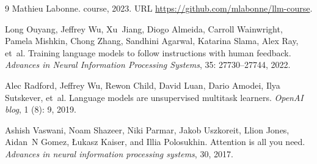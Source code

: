 \begin{thebibliography}{9}
Mathieu Labonne.
 course, 2023.
\newblock URL \url{https://github.com/mlabonne/llm-course}.

Long Ouyang, Jeffrey Wu, Xu~Jiang, Diogo Almeida, Carroll Wainwright, Pamela Mishkin, Chong Zhang, Sandhini Agarwal, Katarina Slama, Alex Ray, et~al.
\newblock Training language models to follow instructions with human feedback.
\newblock \emph{Advances in Neural Information Processing Systems}, 35: 27730--27744, 2022.

Alec Radford, Jeffrey Wu, Rewon Child, David Luan, Dario Amodei, Ilya Sutskever, et~al.
\newblock Language models are unsupervised multitask learners.
\newblock \emph{OpenAI blog}, 1 (8): 9, 2019.

Ashish Vaswani, Noam Shazeer, Niki Parmar, Jakob Uszkoreit, Llion Jones, Aidan~N Gomez, {\L}ukasz Kaiser, and Illia Polosukhin.
\newblock Attention is all you need.
\newblock \emph{Advances in neural information processing systems}, 30, 2017.

\end{thebibliography}
